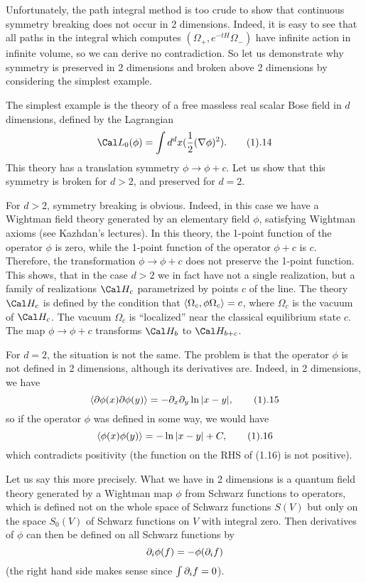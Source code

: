 Unfortunately, the path integral method is too crude to show that
continuous symmetry breaking does not occur in 2 dimensions. 
Indeed, it is easy to see 
that all paths in the integral which computes $(\Omega_+,e^{-tH}\Omega_-)$ 
have infinite action in infinite volume, so we can derive 
no contradiction. So let us demonstrate 
why symmetry is preserved in 2 dimensions and broken 
above 2 dimensions by considering the simplest example.  

The simplest example is the theory
of a free massless real scalar Bose field
in $d$ dimensions, defined by the Lagrangian
$$
\Cal L_0(\phi)=\int d^dx(\frac{1}{2}(\nabla\phi)^2).\tag 1.14
$$
This theory has a translation symmetry $\phi\to \phi+c$. 
Let us show that this symmetry is broken for $d>2$, and preserved for $d=2$.

For $d>2$, symmetry breaking is obvious. Indeed, 
in this case we have a Wightman field theory 
generated by an elementary field $\phi$, satisfying Wightman axioms
(see Kazhdan's lectures). In this theory, the 
1-point function of the operator $\phi$ is zero, while 
the 1-point function of the operator $\phi+c$ is $c$. 
Therefore, the transformation $\phi\to\phi+c$ does not 
preserve the 1-point function. This shows, that in the case
$d>2$ we in fact have not a single realization, but 
a family of realizations $\Cal H_c$ parametrized by 
points $c$ of the line. The theory $\Cal H_c$ is defined by
the condition that $\langle\Omega_c,\phi \Omega_c\rangle=c$, where 
$\Omega_c$ is the vacuum of $\Cal H_c$. The vacuum $\Omega_c$ is
``localized'' near the classical equilibrium state $c$. 
The map $\phi\to \phi+c$ transforms $\Cal H_b$ to $\Cal H_{b+c}$. 

For $d=2$, the situation is not the same. 
The problem is that the operator $\phi$ is not defined in 2 dimensions, 
although its derivatives are. Indeed, in 2 dimensions, we have
$$
\<\d\phi(x)\d\phi(y)\>=-\d_x\d_y\ln|x-y|,\tag 1.15
$$
so if the operator $\phi$ was defined in some way, we would have 
$$
\<\phi(x)\phi(y)\>=-\ln|x-y|+C,\tag 1.16
$$
which contradicts positivity (the function on the RHS of (1.16) is not positive).

Let us say this more precisely. 
What we have in 2 dimensions is a quantum field theory generated by a  
 Wightman map 
$\phi$ from Schwarz functions to operators, which 
is defined not on the whole space of Schwarz functions 
$S(V)$ but only on the space $S_0(V)$ 
of Schwarz functions on $V$ with integral zero. 
Then derivatives of $\phi$ can then be defined on all Schwarz functions
by
$$
\partial_i\phi(f)=-\phi(\partial_if)
$$
(the right hand side makes sense since $\int\partial_if=0$).  

